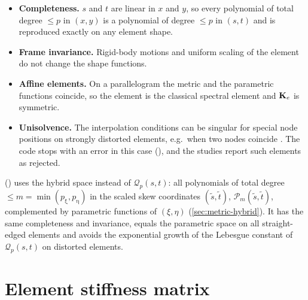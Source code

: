 \begin{itemize}
  \item \textbf{Completeness.} $s$ and $t$ are linear in $x$ and $y$, so every
    polynomial of total degree $\le p$ in $(x,y)$ is a polynomial of degree $\le p$
    in $(s,t)$ and is reproduced exactly on any element shape.
  \item \textbf{Frame invariance.} Rigid-body motions and uniform scaling of the
    element do not change the shape functions.
  \item \textbf{Affine elements.} On a parallelogram the metric and the
    parametric functions coincide, so the element is the classical spectral
    element and $\mathbf{K}_e$ is symmetric.
  \item \textbf{Unisolvence.} The interpolation conditions can be singular for
    special node positions on strongly distorted elements, e.g.\ when two nodes
    coincide \parencite{Ooi2008Remedies}. The code stops with an error in this
    case (), and the studies report such elements as
    rejected.
\end{itemize}

 () uses the hybrid space instead of
$\mathcal Q_p(s,t)$: all polynomials of total degree $\le m=\min(p_\upxi,p_\upeta)$ in
the scaled skew coordinates $(\tilde s,\tilde t)$, $\mathcal P_m(\tilde s,\tilde t)$,
complemented by parametric functions of $(\xi,\eta)$
(\cref{sec:metric-hybrid}). It has the same
completeness and invariance, equals the parametric space on all straight-edged
elements and avoids the exponential growth of the Lebesgue constant of
$\mathcal Q_p(s,t)$ on distorted elements.

\section{Element stiffness matrix}

